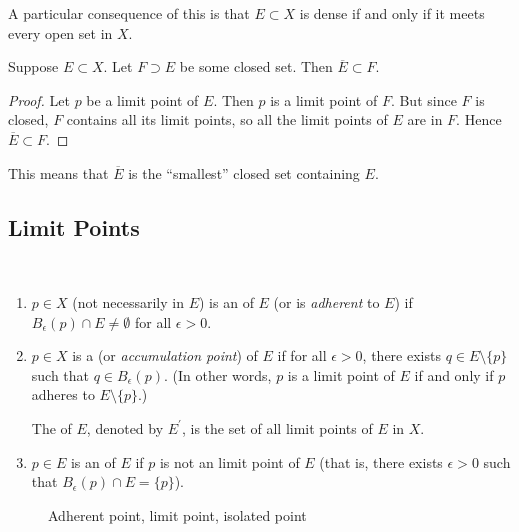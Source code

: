 \begin{remark}
A particular consequence of this is that $E\subset X$ is dense if and only if it meets every open set in $X$.
\end{remark}

\begin{proposition}
Suppose $E\subset X$. Let $F\supset E$ be some closed set. Then $\overline{E}\subset F$.
\end{proposition}

\begin{proof}
Let $p$ be a limit point of $E$. Then $p$ is a limit point of $F$. But since $F$ is closed, $F$ contains all its limit points, so all the limit points of $E$ are in $F$. Hence $\overline{E}\subset F$. 
\end{proof}

\begin{remark}
This means that $\overline{E}$ is the ``smallest'' closed set containing $E$.
\end{remark}

\subsection{Limit Points}
\begin{definition} \
\begin{enumerate}[label=(\roman*)]
\item $p\in X$ (not necessarily in $E$) is an  of $E$ (or is \emph{adherent} to $E$) if $B_\epsilon(p)\cap E\neq\emptyset$ for all $\epsilon>0$.
\item $p\in X$ is a \vocab{limit point}\index{limit point} (or \emph{accumulation point}) of $E$ if for all $\epsilon>0$, there exists $q\in E\setminus\{p\}$ such that $q\in B_\epsilon(p)$. (In other words, $p$ is a limit point of $E$ if and only if $p$ adheres to $E\setminus\{p\}$.)

The  of $E$, denoted by $E^\prime$, is the set of all limit points of $E$ in $X$.

\item $p\in E$ is an  of $E$ if $p$ is not an limit point of $E$ (that is, there exists $\epsilon>0$ such that $B_\epsilon(p)\cap E=\{p\}$).
\end{enumerate}
\end{definition}

\begin{figure}[H]
\centering
{}
\caption{Adherent point, limit point, isolated point}
\end{figure}

